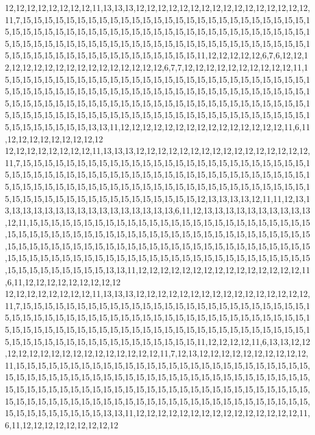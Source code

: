12,12,12,12,12,12,12,12,11,13,13,13,12,12,12,12,12,12,12,12,12,12,12,12,12,12,12,12,11,7,15,15,15,15,15,15,15,15,15,15,15,15,15,15,15,15,15,15,15,15,15,15,15,15,15,15,15,15,15,15,15,15,15,15,15,15,15,15,15,15,15,15,15,15,15,15,15,15,15,15,15,15,15,15,15,15,15,15,15,15,15,15,15,15,15,15,15,15,15,15,15,15,15,15,15,15,15,15,15,15,15,15,15,15,15,15,15,15,15,15,15,15,15,15,15,15,15,15,15,15,11,12,12,12,12,12,6,7,6,12,12,12,12,12,12,12,12,12,12,12,12,12,12,12,12,12,6,7,7,12,12,12,12,12,12,12,12,12,12,11,15,15,15,15,15,15,15,15,15,15,15,15,15,15,15,15,15,15,15,15,15,15,15,15,15,15,15,15,15,15,15,15,15,15,15,15,15,15,15,15,15,15,15,15,15,15,15,15,15,15,15,15,15,15,15,15,15,15,15,15,15,15,15,15,15,15,15,15,15,15,15,15,15,15,15,15,15,15,15,15,15,15,15,15,15,15,15,15,15,15,15,15,15,15,15,15,15,15,15,15,15,15,15,15,15,15,15,15,15,15,15,15,15,15,15,15,15,15,15,15,13,13,11,12,12,12,12,12,12,12,12,12,12,12,12,12,12,12,11,6,11,12,12,12,12,12,12,12,12,12
12,12,12,12,12,12,12,12,11,13,13,13,12,12,12,12,12,12,12,12,12,12,12,12,12,12,12,12,11,7,15,15,15,15,15,15,15,15,15,15,15,15,15,15,15,15,15,15,15,15,15,15,15,15,15,15,15,15,15,15,15,15,15,15,15,15,15,15,15,15,15,15,15,15,15,15,15,15,15,15,15,15,15,15,15,15,15,15,15,15,15,15,15,15,15,15,15,15,15,15,15,15,15,15,15,15,15,15,15,15,15,15,15,15,15,15,15,15,15,15,15,15,15,15,15,15,15,15,15,15,12,13,13,13,13,12,11,11,12,13,13,13,13,13,13,13,13,13,13,13,13,13,13,13,13,13,6,11,12,13,13,13,13,13,13,13,13,13,13,12,11,15,15,15,15,15,15,15,15,15,15,15,15,15,15,15,15,15,15,15,15,15,15,15,15,15,15,15,15,15,15,15,15,15,15,15,15,15,15,15,15,15,15,15,15,15,15,15,15,15,15,15,15,15,15,15,15,15,15,15,15,15,15,15,15,15,15,15,15,15,15,15,15,15,15,15,15,15,15,15,15,15,15,15,15,15,15,15,15,15,15,15,15,15,15,15,15,15,15,15,15,15,15,15,15,15,15,15,15,15,15,15,15,15,15,15,15,15,15,15,13,13,11,12,12,12,12,12,12,12,12,12,12,12,12,12,12,12,11,6,11,12,12,12,12,12,12,12,12,12
12,12,12,12,12,12,12,12,11,13,13,13,12,12,12,12,12,12,12,12,12,12,12,12,12,12,12,12,11,7,15,15,15,15,15,15,15,15,15,15,15,15,15,15,15,15,15,15,15,15,15,15,15,15,15,15,15,15,15,15,15,15,15,15,15,15,15,15,15,15,15,15,15,15,15,15,15,15,15,15,15,15,15,15,15,15,15,15,15,15,15,15,15,15,15,15,15,15,15,15,15,15,15,15,15,15,15,15,15,15,15,15,15,15,15,15,15,15,15,15,15,15,15,15,15,15,15,15,15,15,11,12,12,12,12,11,6,13,13,12,12,12,12,12,12,12,12,12,12,12,12,12,12,12,12,11,7,12,13,12,12,12,12,12,12,12,12,12,12,11,15,15,15,15,15,15,15,15,15,15,15,15,15,15,15,15,15,15,15,15,15,15,15,15,15,15,15,15,15,15,15,15,15,15,15,15,15,15,15,15,15,15,15,15,15,15,15,15,15,15,15,15,15,15,15,15,15,15,15,15,15,15,15,15,15,15,15,15,15,15,15,15,15,15,15,15,15,15,15,15,15,15,15,15,15,15,15,15,15,15,15,15,15,15,15,15,15,15,15,15,15,15,15,15,15,15,15,15,15,15,15,15,15,15,15,15,15,15,15,15,13,13,11,12,12,12,12,12,12,12,12,12,12,12,12,12,12,12,11,6,11,12,12,12,12,12,12,12,12,12
